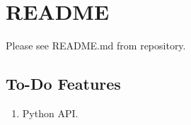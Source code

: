 \chapter{README}
\label{ch:intro}

Please see README.md from repository.

\section{To-Do Features} 

\begin{enumerate}
    \item Python API.
\end{enumerate}
